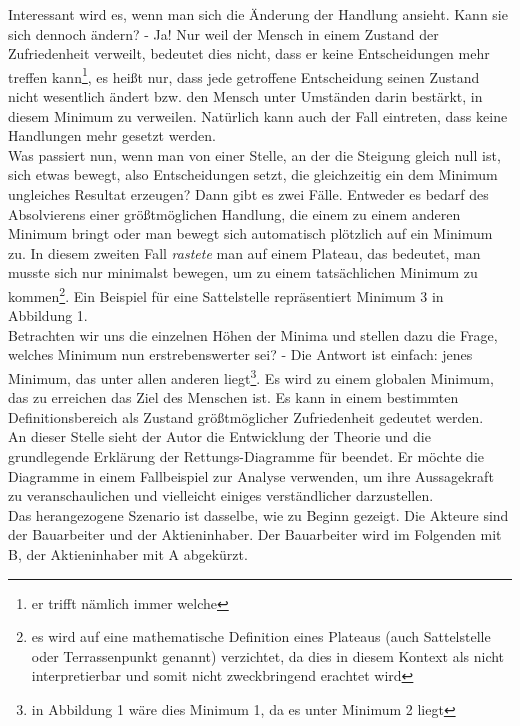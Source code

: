 \documentclass[12pt,a4paper,oneside]{article}
\begin{document}
  Interessant wird es, wenn man sich die Änderung der Handlung ansieht. Kann sie sich dennoch ändern? - Ja! Nur weil der Mensch in einem Zustand der Zufriedenheit verweilt, bedeutet dies nicht, dass er keine Entscheidungen mehr treffen kann\footnote{er trifft nämlich immer welche}, es heißt nur, dass jede getroffene Entscheidung seinen Zustand nicht wesentlich ändert bzw. den Mensch unter Umständen darin bestärkt, in diesem Minimum zu verweilen. Natürlich kann auch der Fall eintreten, dass keine Handlungen mehr gesetzt werden.\\
  
  Was passiert nun, wenn man von einer Stelle, an der die Steigung gleich null ist, sich etwas bewegt, also Entscheidungen setzt, die gleichzeitig ein dem Minimum ungleiches Resultat erzeugen? Dann gibt es zwei Fälle. Entweder es bedarf des Absolvierens einer größtmöglichen Handlung, die einem zu einem anderen Minimum bringt oder man bewegt sich automatisch plötzlich auf ein Minimum zu. In diesem zweiten Fall \textit{rastete} man auf einem Plateau, das bedeutet, man musste sich nur minimalst bewegen, um zu einem tatsächlichen Minimum zu kommen\footnote{es wird auf eine mathematische Definition eines Plateaus (auch Sattelstelle oder Terrassenpunkt genannt) verzichtet, da dies in diesem Kontext als nicht interpretierbar und somit nicht zweckbringend erachtet wird}. Ein Beispiel für eine Sattelstelle repräsentiert Minimum 3 in Abbildung 1. \\
  
  Betrachten wir uns die einzelnen Höhen der Minima und stellen dazu die Frage, welches Minimum nun erstrebenswerter sei? - Die Antwort ist einfach: jenes Minimum, das unter allen anderen liegt\footnote{in Abbildung 1 wäre dies Minimum 1, da es unter Minimum 2 liegt}. Es wird zu einem globalen Minimum, das zu erreichen das Ziel des Menschen ist. Es kann in einem bestimmten Definitionsbereich als Zustand größtmöglicher Zufriedenheit gedeutet werden. \\
  
  An dieser Stelle sieht der Autor die Entwicklung der Theorie und die grundlegende Erklärung der Rettungs-Diagramme für beendet. Er möchte die Diagramme in einem Fallbeispiel zur Analyse verwenden, um ihre Aussagekraft zu veranschaulichen und vielleicht einiges verständlicher darzustellen. \\
  
   Das herangezogene Szenario ist dasselbe, wie zu Beginn gezeigt. Die Akteure sind der Bauarbeiter und der Aktieninhaber. Der Bauarbeiter wird im Folgenden mit B, der Aktieninhaber mit A abgekürzt.
   
\end{document}
